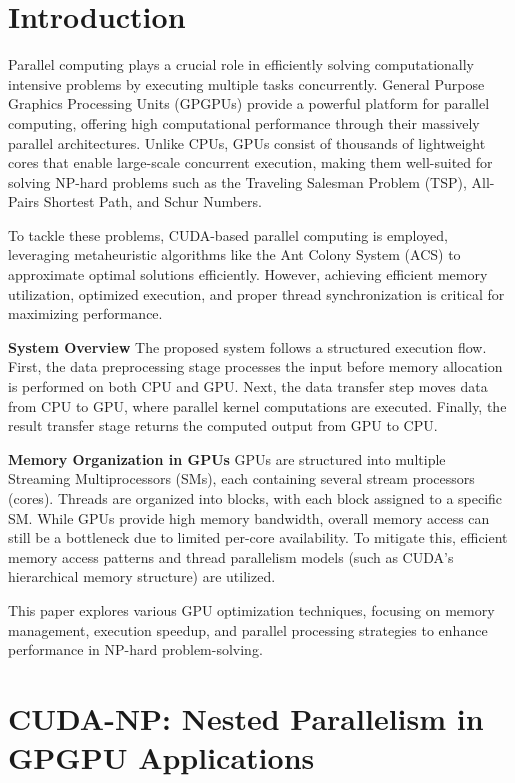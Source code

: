 \documentclass{report}
\begin{document}
\section{Introduction}

Parallel computing plays a crucial role in efficiently solving computationally intensive problems by executing multiple tasks concurrently. General Purpose Graphics Processing Units (GPGPUs) provide a powerful platform for parallel computing, offering high computational performance through their massively parallel architectures. Unlike CPUs, GPUs consist of thousands of lightweight cores that enable large-scale concurrent execution, making them well-suited for solving NP-hard problems such as the Traveling Salesman Problem (TSP), All-Pairs Shortest Path, and Schur Numbers.

To tackle these problems, CUDA-based parallel computing is employed, leveraging metaheuristic algorithms like the Ant Colony System (ACS) to approximate optimal solutions efficiently. However, achieving efficient memory utilization, optimized execution, and proper thread synchronization is critical for maximizing performance.  

\textbf{System Overview}  
The proposed system follows a structured execution flow. First, the data preprocessing stage processes the input before memory allocation is performed on both CPU and GPU. Next, the data transfer step moves data from CPU to GPU, where parallel kernel computations are executed. Finally, the result transfer stage returns the computed output from GPU to CPU.  

\textbf{Memory Organization in GPUs } 
GPUs are structured into multiple Streaming Multiprocessors (SMs), each containing several stream processors (cores). Threads are organized into blocks, with each block assigned to a specific SM. While GPUs provide high memory bandwidth, overall memory access can still be a bottleneck due to limited per-core availability. To mitigate this, efficient memory access patterns and thread parallelism models (such as CUDA’s hierarchical memory structure) are utilized.

This paper explores various GPU optimization techniques, focusing on memory management, execution speedup, and parallel processing strategies to enhance performance in NP-hard problem-solving.


\section{CUDA-NP: Nested Parallelism in GPGPU Applications}
\end{document}
